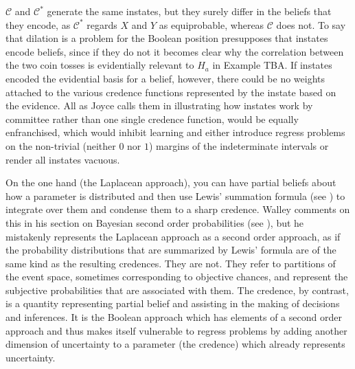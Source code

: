 \documentclass[11pt]{article}
\begin{document}

$\mathcal{C}$ and $\mathcal{C}^{*}$ generate the same instates, but
they surely differ in the beliefs that they encode, as
$\mathcal{C}^{*}$ regards $X$ and $Y$ as equiprobable, whereas
$\mathcal{C}$ does not. To say that dilation is a problem for the
Boolean position presupposes that instates encode beliefs, since if
they do not it becomes clear why the correlation between the two coin
tosses is evidentially relevant to $H_{a}$ in Example TBA\tbd{}. If
instates encoded the evidential basis for a belief, however, there
could be no weights attached to the various credence functions
represented by the instate based on the evidence. All  as Joyce calls them in illustrating how instates work by
committee rather than one single credence function, would be equally
enfranchised, which would inhibit learning and either introduce
regress problems on the non-trivial (neither $0$ nor $1$) margins of
the indeterminate intervals or render all instates vacuous.

On the one hand (the Laplacean approach), you can have partial beliefs
about how a parameter is distributed and then use Lewis' summation
formula (see ) to integrate over them and
condense them to a sharp credence. Walley comments on this
 in his section on Bayesian second order
probabilities (see ), but he mistakenly
represents the Laplacean approach as a second order approach, as if
the probability distributions that are summarized by Lewis' formula
are of the same kind as the resulting credences. They are not. They
refer to partitions of the event space, sometimes corresponding to
objective chances, and represent the subjective probabilities that are
associated with them. The credence, by contrast, is a quantity
representing partial belief and assisting in the making of decisions
and inferences. It is the Boolean approach which has elements of a
second order approach and thus makes itself vulnerable to regress
problems by adding another dimension of uncertainty to a parameter
(the credence) which already represents uncertainty.
\end{document}
